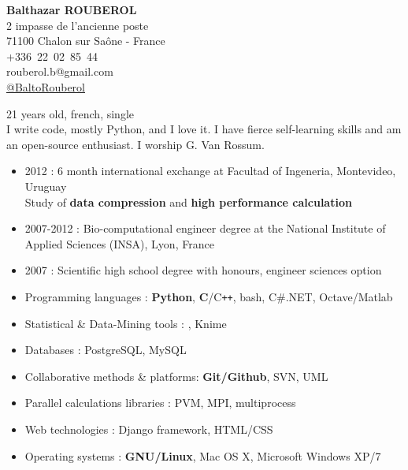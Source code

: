 


\pagestyle{empty}

\begin{minipage}{0.4\textwidth}
\raggedright
{
        \textbf{{\Large Balthazar ROUBEROL}}\\
        \medskip
        {\scriptsize 2 impasse de l'ancienne poste\\
        71100 Chalon sur Saône - France \\
        +336~22~02~85~44 \\
        rouberol.b@gmail.com\\
        \href{https://twitter.com/BaltoRouberol}{@BaltoRouberol}}
}
\end{minipage}
\begin{minipage}{0.5\textwidth}
\raggedleft
{
}
\end{minipage}

\bigskip


{\scriptsize 21 years old, french, single\\I write code, mostly Python, and I love it. I have fierce self-learning skills and am an open-source enthusiast. I worship G. Van Rossum.}\\

\vspace{-7mm}

\begin{itemize}
\renewcommand{\labelitemi}{$\circ$}
		\item 2012 : 6 month international exchange at Facultad of Ingeneria, Montevideo, Uruguay\\ Study of \textbf{data compression} and \textbf{high performance calculation}
        \item 2007-2012 : Bio-computational engineer degree at the National Institute of Applied Sciences (INSA), Lyon, France
        \item 2007 : Scientific high school degree with honours, engineer sciences option
\end{itemize}


\begin{itemize}
\renewcommand{\labelitemi}{$\circ$}
    \item Programming languages : \textbf{Python}, \textbf{C}/C{\tt ++}, bash, C\#.NET, Octave/Matlab
    \item Statistical \& Data-Mining tools : \Rlogo, Knime
    \item Databases : PostgreSQL, MySQL
    \item Collaborative methods \& platforms: \textbf{Git/Github}, SVN, UML
    \item Parallel calculations libraries : PVM, MPI, multiprocess
    \item Web technologies : Django framework, HTML/CSS
    \item Operating systems : \textbf{GNU/Linux}, Mac OS X, Microsoft Windows XP/7
\end{itemize}


